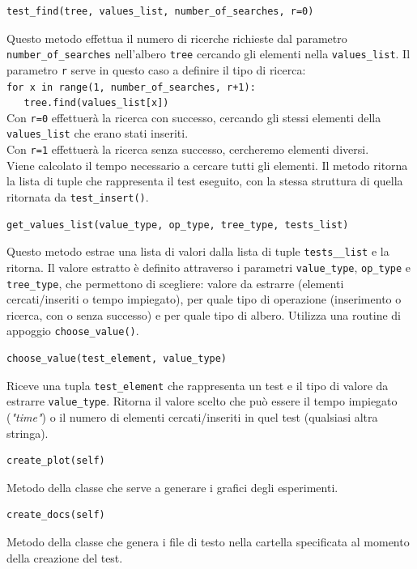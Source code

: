 \documentclass{article}
\begin{document}
\begin{verbatim}test_find(tree, values_list, number_of_searches, r=0)\end{verbatim}
Questo metodo effettua il numero di ricerche richieste dal parametro \verb|number_of_searches| nell'albero \verb|tree| cercando gli elementi nella \verb|values_list|. Il parametro \verb|r| serve in questo caso a definire il tipo di ricerca: \\
\verb|for x in range(1, number_of_searches, r+1):|\\
\verb|   tree.find(values_list[x])|\\
Con \verb|r=0| effettuerà la ricerca con successo, cercando gli stessi elementi della \verb|values_list| che erano stati inseriti. \\
Con \verb|r=1| effettuerà la ricerca senza successo, cercheremo elementi diversi.\\
Viene calcolato il tempo necessario a cercare tutti gli elementi. Il metodo ritorna la lista di tuple che rappresenta il test eseguito, con la stessa struttura di quella ritornata da \verb|test_insert()|.
\begin{verbatim}get_values_list(value_type, op_type, tree_type, tests_list)\end{verbatim}
Questo metodo estrae una lista di valori dalla lista di tuple \verb|tests__list| e la ritorna. Il valore estratto è definito attraverso i parametri \verb|value_type|, \verb|op_type| e \verb|tree_type|, che permettono di scegliere: valore da estrarre (elementi cercati/inseriti o tempo impiegato), per quale tipo di operazione (inserimento o ricerca, con o senza successo) e per quale tipo di albero. Utilizza una routine di appoggio \verb|choose_value()|.
\begin{verbatim}choose_value(test_element, value_type)\end{verbatim}
Riceve una tupla \verb|test_element| che rappresenta un test e il tipo di valore da estrarre \verb|value_type|. Ritorna il valore scelto che può essere il tempo impiegato (\emph{"time"}) o il numero di elementi cercati/inseriti in quel test (qualsiasi altra stringa). 
\begin{verbatim}create_plot(self)\end{verbatim}
Metodo della classe che serve a generare i grafici degli esperimenti.
\begin{verbatim}create_docs(self)\end{verbatim}
Metodo della classe che genera i file di testo nella cartella specificata al momento della creazione del test.
\end{document}
